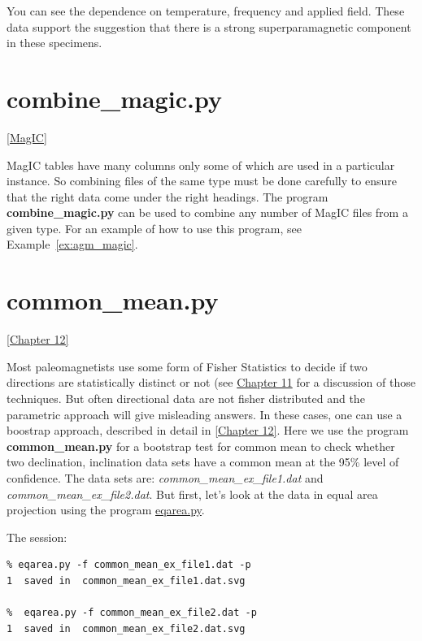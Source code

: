 \documentclass[11pt]{book}
\begin{document}
{{{{{You can see the dependence on temperature, frequency and applied field.  These data support the suggestion that there is a strong superparamagnetic component in these specimens.   

\section {\bf combine\_magic.py} \href{#MagIC}{[MagIC]}
\label{ex:combine_magic}

MagIC tables have many columns only some of which are used in a particular instance.  So combining files of the same type must be done carefully to ensure that the right data come under the right headings.  The program {\bf combine\_magic.py} can be used to combine any number of MagIC files from a given type.    For an example of how to use this program, see Example~\ref{ex:agm_magic}. 

\section {\bf common\_mean.py} 
\href{http://magician.ucsd.edu/Essentials/WebBook2.html#Beyond_Fisher_statistics}{[Chapter 12]}

Most paleomagnetists use some form of Fisher Statistics to decide if two directions are statistically distinct or not (see \href{http://magician.ucsd.edu/Essentials/WebBook2.html#Fisher_statistics}{Chapter 11} for a discussion of those techniques.  But often directional data are not fisher distributed and the parametric approach will give misleading answers.  In these cases, one can use a boostrap approach, described in detail in \href{http://magician.ucsd.edu/Essentials/WebBook2.html#Beyond_Fisher_statistics}{[Chapter 12]}.  Here we
use the program {\bf common\_mean.py} for a bootstrap test for common mean to check whether two declination, inclination data sets have a common mean at the 95\% level of confidence.    The data sets are: {\it common\_mean\_ex\_file1.dat } and {\it common\_mean\_ex\_file2.dat}.  But first, let's look at the data in equal area projection  using the program \href{#eqarea.py}{eqarea.py}.

The session: 
\begin{verbatim}
% eqarea.py -f common_mean_ex_file1.dat -p
1  saved in  common_mean_ex_file1.dat.svg

%  eqarea.py -f common_mean_ex_file2.dat -p
1  saved in  common_mean_ex_file2.dat.svg
\end{verbatim} 

}}}}}
\end{document}
